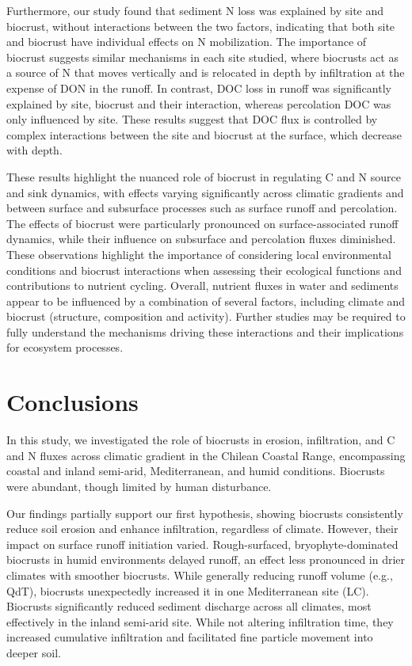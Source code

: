 Furthermore, our study found that sediment N loss was explained by site and biocrust, without interactions between the two factors, indicating that both site and biocrust have individual effects on N mobilization. The importance of biocrust suggests similar mechanisms in each site studied, where biocrusts act as a source of N that moves vertically and is relocated in depth by infiltration at the expense of DON in the runoff. In contrast, DOC loss in runoff was significantly explained by site, biocrust and their interaction, whereas percolation DOC was only influenced by site. These results suggest that DOC flux is controlled by complex interactions between the site and biocrust at the surface, which decrease with depth.

These results highlight the nuanced role of biocrust in regulating C and N source and sink dynamics, with effects varying significantly across climatic gradients and between surface and subsurface processes such as surface runoff and percolation. The effects of biocrust were particularly pronounced on surface-associated runoff dynamics, while their influence on subsurface and percolation fluxes diminished. These observations highlight the importance of considering local environmental conditions and biocrust interactions when assessing their ecological functions and contributions to nutrient cycling. Overall, nutrient fluxes in water and sediments appear to be influenced by a combination of several factors, including climate and biocrust (structure, composition and activity). Further studies may be required to fully understand the mechanisms driving these interactions and their implications for ecosystem processes.

\section{Conclusions}

In this study, we investigated the role of biocrusts in erosion, infiltration, and C and N fluxes across climatic gradient in the Chilean Coastal Range, encompassing coastal and inland semi-arid, Mediterranean, and humid conditions. Biocrusts were abundant, though limited by human disturbance.

Our findings partially support our first hypothesis, showing biocrusts consistently reduce soil erosion and enhance infiltration, regardless of climate. However, their impact on surface runoff initiation varied. Rough-surfaced, bryophyte-dominated biocrusts in humid environments delayed runoff, an effect less pronounced in drier climates with smoother biocrusts. While generally reducing runoff volume (e.g., QdT), biocrusts unexpectedly increased it in one Mediterranean site (LC). Biocrusts significantly reduced sediment discharge across all climates, most effectively in the inland semi-arid site. While not altering infiltration time, they increased cumulative infiltration and facilitated fine particle movement into deeper soil.

